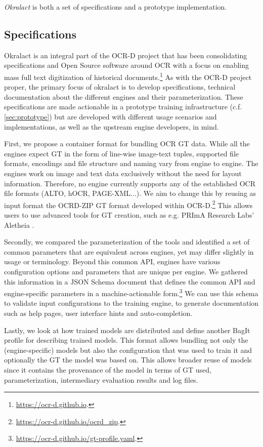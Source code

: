 \documentclass[conference]{IEEEtran}
\begin{document}
\textit{Okralact} is both a set of specifications and a prototype
implementation.

\subsection*{Specifications}

Okralact is an integral part of the OCR-D project that has been
consolidating specifications and Open Source software around OCR
with a focus on enabling mass full text digitization of historical
documents.\footnote{\url{https://ocr-d.github.io}.} As with the
OCR-D project proper, the primary focus of okralact is to develop
specifications, technical documentation about the different engines
and their parameterization. These specifications are made
actionable in a prototype training infrastructure (c.f.
\ref{sec:prototype}) but are developed with different usage
scenarios and implementations, as well as the upstream engine
developers, in mind.

First, we propose a container format for bundling OCR GT data.
While all the engines expect GT in the form of line-wise image-text
tuples, supported file formats, encodings and file structure and
naming vary from engine to engine. The engines work on image and
text data exclusively without the need for layout information.
Therefore, no engine currently supports any of the established OCR
file formats (ALTO, hOCR, PAGE-XML...). We aim to change this by
reusing as input format the OCRD-ZIP GT format developed within
OCR-D.\footnote{\url{https://ocr-d.github.io/ocrd_zip}.} This
allows users to use advanced tools for GT creation, such as e.g. 
PRImA Research Labs' Aletheia \cite{clausner2011aletheia}.

Secondly, we compared the parameterization of the tools and
identified a set of common parameters that are equivalent across
engines, yet may differ slightly in usage or terminology. Beyond
this common API, engines have various configuration options and
parameters that are unique per engine. We gathered this information
in a JSON Schema document that defines the common API and
engine-specific parameters in a machine-actionable
form.\footnote{\url{https://ocr-d.github.io/gt-profile.yaml}.} We
can use this schema to validate input configurations to the
training engine, to generate documentation such as help pages, user
interface hints and auto-completion.

Lastly, we look at how trained models are distributed and
define another BagIt profile for describing trained models. This
format allows bundling not only the (engine-specific) models but
also the configuration that was used to train it and optionally the
GT the model was based on. This allows broader reuse of models
since it contains the provenance of the model in terms of GT used,
parameterization, intermediary evaluation results and log files.
\end{document}
